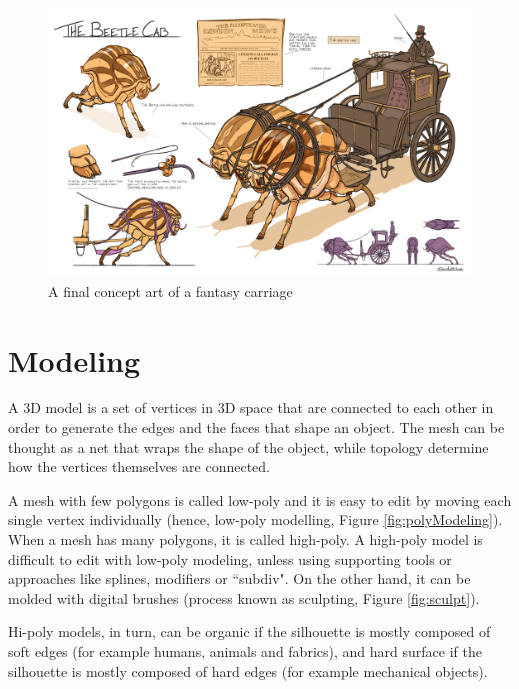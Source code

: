 \documentclass[12pt,twoside]{report}
\begin{document}
\begin{figure}[hp]
    \centering
    \includegraphics[width=\textwidth]{graphics/beetleCab_conceptArt.jpg}
    \caption[A final concept art of a fantasy carriage]{A final concept art of a fantasy carriage \\  }
    \label{fig:beetleCabConcept}
\end{figure}

\section{Modeling}
\label{sec:modeling}
A 3D model is a set of vertices in 3D space that are connected to each other in order to generate the edges and the faces that shape an object. The mesh can be thought as a net that wraps the shape of the object, while topology determine how the vertices themselves are connected.

A mesh with few polygons is called low-poly and it is easy to edit by moving each single vertex individually (hence, low-poly modelling, Figure \ref{fig:polyModeling}). When a mesh has many polygons, it is called high-poly. A high-poly model is difficult to edit with low-poly modeling, unless using supporting tools or approaches like splines, modifiers or ``subdiv". On the other hand, it can be molded with digital brushes (process known as sculpting, Figure \ref{fig:sculpt}).

Hi-poly models, in turn, can be organic if the silhouette is mostly composed of soft edges (for example humans, animals and fabrics), and hard surface if the silhouette is mostly composed of hard edges (for example mechanical objects).
\end{document}
